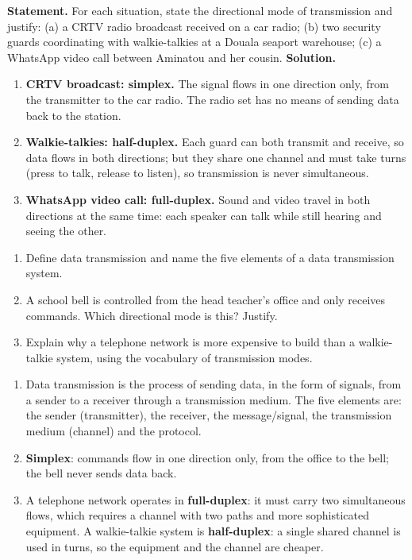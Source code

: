 \documentclass[11pt]{article}
\begin{document}
\begin{exoresolu}
\textbf{Statement.} For each situation, state the directional mode of transmission and justify: (a) a CRTV radio broadcast received on a car radio; (b) two security guards coordinating with walkie-talkies at a Douala seaport warehouse; (c) a WhatsApp video call between Aminatou and her cousin.
\tcblower
\textbf{Solution.}
\begin{enumerate}
\item \textbf{CRTV broadcast: simplex.} The signal flows in one direction only, from the transmitter to the car radio. The radio set has no means of sending data back to the station.
\item \textbf{Walkie-talkies: half-duplex.} Each guard can both transmit and receive, so data flows in both directions; but they share one channel and must take turns (press to talk, release to listen), so transmission is never simultaneous.
\item \textbf{WhatsApp video call: full-duplex.} Sound and video travel in both directions at the same time: each speaker can talk while still hearing and seeing the other.
\end{enumerate}
\end{exoresolu}

\begin{exercice}
\begin{enumerate}
\item Define data transmission and name the five elements of a data transmission system.
\item A school bell is controlled from the head teacher's office and only receives commands. Which directional mode is this? Justify.
\item Explain why a telephone network is more expensive to build than a walkie-talkie system, using the vocabulary of transmission modes.
\end{enumerate}
\end{exercice}

\begin{corrige}[Exercise 1]
\begin{enumerate}
\item Data transmission is the process of sending data, in the form of signals, from a sender to a receiver through a transmission medium. The five elements are: the sender (transmitter), the receiver, the message/signal, the transmission medium (channel) and the protocol.
\item \textbf{Simplex}: commands flow in one direction only, from the office to the bell; the bell never sends data back.
\item A telephone network operates in \textbf{full-duplex}: it must carry two simultaneous flows, which requires a channel with two paths and more sophisticated equipment. A walkie-talkie system is \textbf{half-duplex}: a single shared channel is used in turns, so the equipment and the channel are cheaper.
\end{enumerate}
\end{corrige}
\end{document}
